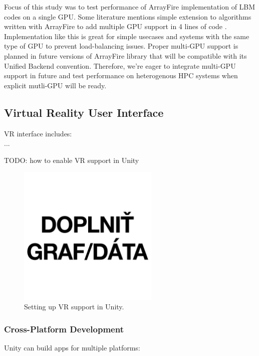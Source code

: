 Focus of this study was to test performance of ArrayFire implementation of LBM codes on a single GPU. Some literature mentions simple extension to algorithms written with ArrayFire to add multiple GPU support in 4 lines of code \cite{malcolmArrayFireGPUAcceleration2012a}. Implementation like this is great for simple usecases and systems with the same type of GPU to prevent load-balancing issues. Proper multi-GPU support is planned in future versions of ArrayFire library that will be compatible with its Unified Backend convention. Therefore, we're eager to integrate multi-GPU support in future and test performance on heterogenous HPC systems when explicit mutli-GPU will be ready.


\subsection{Virtual Reality User Interface}

VR interface includes: \\ 

...

TODO: how to enable VR support in Unity

\begin{figure}[!ht]
	\centering
	\includegraphics[width=0.6\textwidth]{figures/empty.jpg}
	\caption{Setting up VR support in Unity.}
	\label{fig:unity-vr-support}
\end{figure}

\subsubsection{Cross-Platform Development}

Unity can build apps for multiple platforms:

